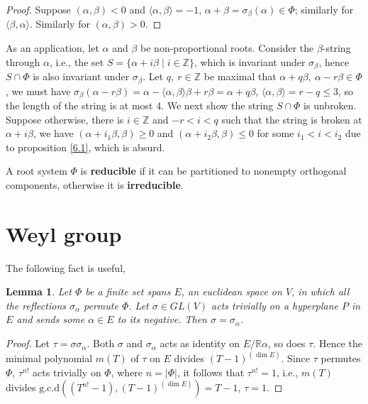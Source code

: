 \documentclass{amsbook}
\newtheorem{lemma}[theorem]{Lemma}
\theoremstyle{definition}
\theoremstyle{remark}
\newcommand{\Z}{\mathbb{Z}}
\newcommand{\R}{\mathbb{R}}
\newcommand{\cartan}[2]{\langle {#1}, {#2} \rangle}
\numberwithin{section}{chapter}
\numberwithin{equation}{chapter}
\begin{document}
\begin{proof}
	 Suppose $(\alpha, \beta) < 0$ and $\cartan{\alpha}{\beta} = -1$, $\alpha + \beta = \sigma_\beta(\alpha) \in \Phi$; similarly for $\cartan{\beta}{\alpha}$. Similarly for $(\alpha, \beta) > 0$.
\end{proof}

As an application, let $\alpha$ and $\beta$ be non-proportional roots. Consider the $\beta$-string through $\alpha$, i.e., the set $S = \{\alpha + i\beta\mid i\in \Z\}$, which is invariant under $\sigma_\beta$, hence $S\cap\Phi$ is also invariant under $\sigma_\beta$. Let $q,\ r\in\Z$ be maximal that $\alpha + q\beta, \ \alpha - r\beta \in \Phi$, we must have $\sigma_\beta(\alpha - r\beta) = \alpha - \cartan{\alpha}{\beta}\beta + r\beta = \alpha + q\beta$, $\cartan{\alpha}{\beta} = r - q \le 3$, so the length of the string is at most 4. We next show the string $S\cap\Phi$ is unbroken. Suppose otherwise, there is $i\in \Z$ and $-r < i < q$ such that the string is broken at $\alpha + i\beta$, we have $(\alpha + i_1\beta, \beta) \ge 0$ and $(\alpha + i_2\beta, \beta) \le 0$ for some $i_1 < i < i_2$ due to proposition \ref{6.1}, which is absurd.

A root system $\Phi$ is \textbf{reducible} if it can be partitioned to nonempty orthogonal components, otherwise it is \textbf{irreducible}.  


\section{Weyl group}
The following fact is useful,

\begin{lemma}{\label{sdf}}
	Let $\Phi$ be a finite set spans $E$, an euclidean space on $V$, in which all the reflections $\sigma_\alpha$ permute $\Phi$. Let $\sigma \in GL(V)$ acts trivially on a hyperplane $P$ in $E$ and sends some $\alpha\in E$ to its negative. Then $\sigma = \sigma_\alpha$.
\end{lemma}
\begin{proof}
	Let $\tau = \sigma\sigma_\alpha$. Both $\sigma$ and $\sigma_\alpha$ acts as identity on $E/\R\alpha$, so does $\tau$. Hence the minimal polynomial $m(T)$ of $\tau$ on $E$ divides $(T - 1)^{(\dim E)}$. Since $\tau$ permutes $\Phi$, $\tau^{n!}$ acts trivially on $\Phi$, where $n = |\Phi|$, it follows that $\tau^{n!} = 1$, i.e., $m(T)$ divides $\text{g.c.d}((T^{n!} - 1), (T - 1)^{(\dim E)}) = T - 1$, $\tau = 1$.
\end{proof}
\end{document}
